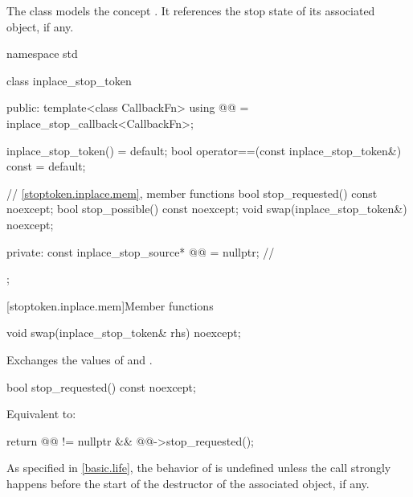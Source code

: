 \pnum
The class  models
the concept .
It references the stop state of
its associated  object,
if any.
%
\begin{codeblock}
namespace std {
  class inplace_stop_token {
  public:
    template<class CallbackFn>
      using @@ = inplace_stop_callback<CallbackFn>;

    inplace_stop_token() = default;
    bool operator==(const inplace_stop_token&) const = default;

    // \ref{stoptoken.inplace.mem}, member functions
    bool stop_requested() const noexcept;
    bool stop_possible() const noexcept;
    void swap(inplace_stop_token&) noexcept;

  private:
    const inplace_stop_source* @@ = nullptr;           // \expos
  };
}
\end{codeblock}

[stoptoken.inplace.mem]{Member functions}

%
\begin{itemdecl}
void swap(inplace_stop_token& rhs) noexcept;
\end{itemdecl}

\begin{itemdescr}
\pnum
\effects
Exchanges the values of  and .
\end{itemdescr}

%
\begin{itemdecl}
bool stop_requested() const noexcept;
\end{itemdecl}

\begin{itemdescr}
\pnum
\effects
Equivalent to:
\begin{codeblock}
return @@ != nullptr && @@->stop_requested();
\end{codeblock}

\pnum
\begin{note}
As specified in \ref{basic.life},
the behavior of  is undefined
unless the call strongly happens before the start of
the destructor of the associated  object, if any.
\end{note}
\end{itemdescr}

